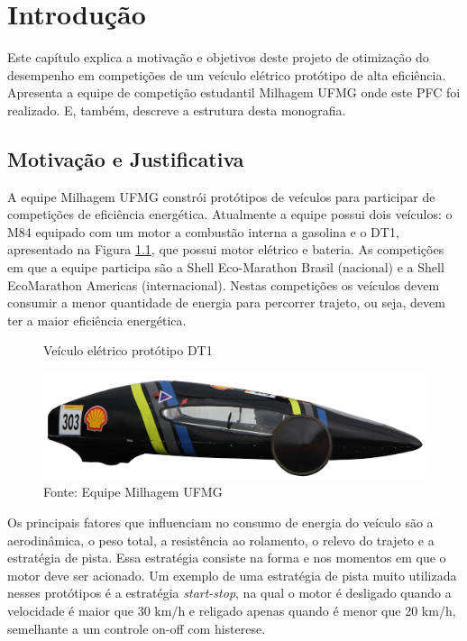 \chapter{Introdução}
\label{chap:intro}
\thispagestyle{empty}

Este capítulo explica a motivação e objetivos deste projeto de otimização do desempenho em competições de um veículo elétrico protótipo de alta eficiência.
Apresenta a equipe de competição estudantil Milhagem UFMG onde este PFC foi realizado. E, também, descreve a estrutura desta monografia.

\section{Motivação e Justificativa}
\label{sec:motivacao}

A equipe Milhagem UFMG constrói protótipos de veículos para participar de competições
de eficiência energética. Atualmente a equipe possui dois veículos: o M84 equipado com um motor a combustão interna a gasolina e o DT1,
 apresentado na Figura \ref{fig:DT1}, que possui motor elétrico e bateria. As competições em que a
equipe participa são a Shell Eco-Marathon Brasil (nacional) e a Shell EcoMarathon Americas (internacional).
Nestas competições os veículos devem consumir a
menor quantidade de energia para percorrer trajeto, ou seja, devem ter a maior eficiência
energética.

\begin{figure}[h]
    \centering
    \caption{Veículo elétrico protótipo DT1}
    \label{fig:DT1}
    \includegraphics[scale=0.11]{Introducao/Figuras/dt1.png}
    \caption*{\footnotesize{Fonte: Equipe Milhagem UFMG}}
\end{figure}

Os principais fatores que influenciam no consumo de energia do veículo são a
aerodinâmica, o peso total, a resistência ao rolamento, o relevo do trajeto e a estratégia
de pista. Essa estratégia consiste na forma e nos momentos em que o motor deve ser
acionado. Um exemplo de uma estratégia de pista muito utilizada nesses protótipos é a
estratégia \textit{start-stop}, na qual o motor é desligado quando a velocidade é maior que 30
km/h e religado apenas quando é menor que 20 km/h, semelhante a um controle on-off
com histerese.

